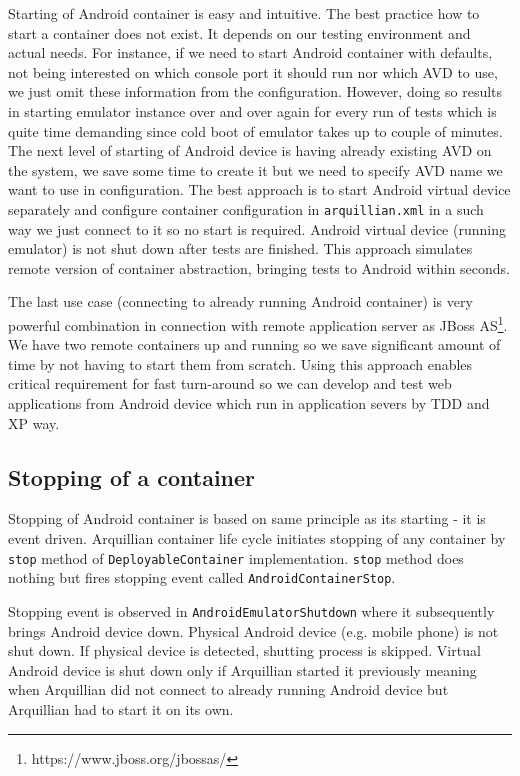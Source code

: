 \documentclass[12pt,final,oneside]{fithesis}
\begin{document}
Starting of Android container is easy and intuitive. The best practice how to start a container does not exist. It depends on our testing environment and actual needs. For instance, if we need to start Android container with defaults, not being interested on which console port it should run nor which AVD to use, we just omit these information from the configuration. However, doing so results in starting emulator instance over and over again for every run of tests which is quite time demanding since cold boot of emulator takes up to couple of minutes. The next level of starting of Android device is having already existing AVD on the system, we save some time to create it but we need to specify AVD name we want to use in configuration. The best approach is to start Android virtual device separately and configure container configuration in \texttt{arquillian.xml} in a such way we just connect to it so no start is required. Android virtual device (running emulator) is not shut down after tests are finished. This approach simulates remote version of container abstraction, bringing tests to Android within seconds.

The last use case (connecting to already running Android container) is very powerful combination in connection with remote application server as JBoss AS\footnote{https://www.jboss.org/jbossas/}. We have two remote containers up and running so we save significant amount of time by not having to start them from scratch. Using this approach enables critical requirement for fast turn-around so we can develop and test web applications from Android device which run in application severs by TDD and XP way.  

		\subsection{Stopping of a container}

Stopping of Android container is based on same principle as its starting - it is event driven. Arquillian container life cycle initiates stopping of any container by \texttt{stop} method of \texttt{DeployableContainer} implementation. \texttt{stop} method does nothing but fires stopping event called \texttt{AndroidContainerStop}.

Stopping event is observed in \texttt{AndroidEmulatorShutdown} where it subsequently brings Android device down. Physical Android device (e.g. mobile phone) is not shut down. If physical device is detected, shutting process is skipped. Virtual Android device is shut down only if Arquillian started it previously meaning when Arquillian did not connect to already running Android device but Arquillian had to start it on its own.
\end{document}
